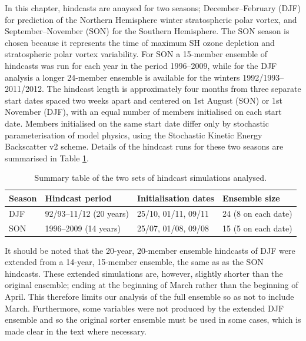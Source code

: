 In this chapter, hindcasts are anaysed for two seasons; December--February (DJF)
for prediction of the Northern Hemisphere winter stratospheric polar vortex, and
September--November (SON) for the Southern Hemisphere. The SON season is chosen
because it represents the time of maximum SH ozone depletion and stratospheric
polar vortex variability. For SON a 15-member ensemble of hindcasts was run for
each year in the period 1996--2009, while for the DJF analysis a longer
24-member ensemble is available for the winters 1992/1993--2011/2012. The
hindcast length is approximately four months from three separate start dates
spaced two weeks apart and centered on 1st August (SON) or 1st November (DJF),
with an equal number of members initialised on each start date. Members
initialised on the same start date differ only by stochastic parameterisation of
model physics, using the Stochastic Kinetic Energy Backscatter v2
\citep[SKEB;][]{Bowler2009} scheme. Details of the hindcast runs for these two
seasons are summarised in Table \ref{tab:seas_runs}.
\begin{table}[h]
\centering
\begin{tabular}{llll} \hline
  Season & Hindcast period                & Initialisation dates & Ensemble size
  \\ \hline
  DJF    & 92/93--11/12 (20 years) & 25/10, 01/11, 09/11  & 24 (8 on each date) \\
  SON    & 1996--2009 (14 years)           & 25/07, 01/08, 09/08  & 15 (5 on each
                                                                   date) \\ \hline
\end{tabular}
\caption{Summary table of the two sets of hindcast simulations analysed.}
\label{tab:seas_runs}
\end{table}

It should be noted that the 20-year, 20-member ensemble hindcasts of DJF were
extended from a 14-year, 15-member ensemble, the same as as the SON
hindcasts. These extended simulations are, however, slightly shorter than the
original ensemble; ending at the beginning of March rather than the beginning of
April. This therefore limits our analysis of the full ensemble so as not to
include March. Furthermore, some variables were not produced by the extended DJF
ensemble and so the original sorter ensemble must be used in some cases, which
is made clear in the text where necessary.

